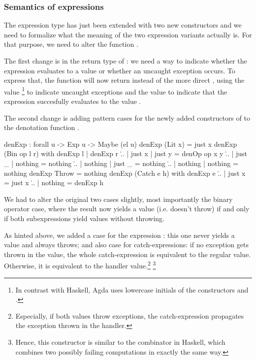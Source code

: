 \subsubsection{Semantics of expressions}

The expression type has just been extended with two new constructors and we
need to formalize what the meaning of the two expression variants actually is.
For that purpose, we need to alter the function .

The first change is in the return type of : we need a way to
indicate whether the expression evaluates to a value or whether an uncaught
exception occurs. To express that, the function  will now return
 instead of the more direct , using the value
\footnote{In contrast with Haskell, Agda uses lowercase initials
of the constructors  and .} to indicate uncaught
exceptions and the value  to indicate that the expression
succesfully evaluates to the value .

The second change is adding pattern cases for the newly added constructors
of  to the denotation function .

\begin{code}
  denExp : forall {u} -> Exp u -> Maybe (el u)
  denExp (Lit x) = just x
  denExp (Bin op l r) with denExp l | denExp r
  \... | just x  | just y  = denOp op x y
  \... | just _  | nothing = nothing
  \... | nothing | just _  = nothing
  \... | nothing | nothing = nothing
  denExp Throw = nothing
  denExp (Catch e h) with denExp e
  \... | just x  = just x
  \... | nothing = denExp h 
\end{code}

\noindent We had to alter the original two cases slightly, most importantly the
binary operator case, where the result now yields a value (i.e.  doesn't throw)
if and only if both subexpressions yield values without throwing.

As hinted above, we added a case for the expression : this one
never yields a value and always throws; and also case for catch-expressions: if
no exception gets thrown in the value, the whole catch-expression is equivalent
to the regular value.  Otherwise, it is equivalent to the handler
value.\footnote{Especially, if both values throw exceptions, the
catch-expression propagates the exception thrown in the handler.}
\footnote{Hence, this constructor is similar to the combinator  in
Haskell, which combines two possibly failing computations in exactly the same
way.}

